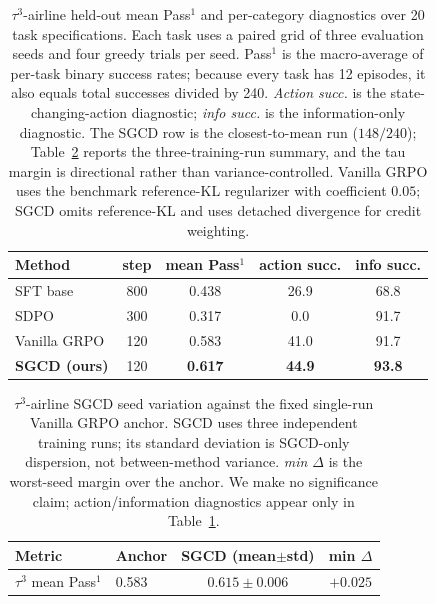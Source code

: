 \begin{table}[t]
  \centering
  \venuecompacttablefont
  \setlength{\tabcolsep}{2.2pt}
  \begin{tabular}{lcccc}
    \hline
    \textbf{Method} & \textbf{step} & \textbf{mean Pass$^1$} & \textbf{action succ.} & \textbf{info succ.} \\
    \hline
    SFT base              & 800 & 0.438 & 26.9 & 68.8 \\
    SDPO                  & 300 & 0.317 & 0.0 & 91.7 \\
    Vanilla GRPO         & 120 & 0.583 & 41.0 & 91.7 \\
    \textbf{SGCD (ours)}  & 120 & \textbf{0.617} & \textbf{44.9} & \textbf{93.8} \\
    \hline
  \end{tabular}
  \caption{$\tau^3$-airline held-out mean Pass$^1$ and per-category
    diagnostics over 20 task specifications. Each task uses a paired grid of
    three evaluation seeds and four greedy trials per seed. Pass$^1$ is the
    macro-average of per-task binary success rates; because every task has 12
    episodes, it also equals total successes divided by 240. \emph{Action succ.} is the state-changing-action
    diagnostic; \emph{info succ.} is the information-only diagnostic. The SGCD
    row is the closest-to-mean run ($148/240$); Table~\ref{tab:seedrobust}
    reports the three-training-run summary, and the tau margin is directional rather
    than variance-controlled. Vanilla GRPO uses the benchmark reference-KL
    regularizer with coefficient $0.05$; SGCD omits reference-KL and uses
    detached divergence for credit weighting.}
  \label{tab:tau3}
\end{table}

\begin{table}[t]
\centering
\small
\setlength{\tabcolsep}{4pt}
  \begin{tabular}{llcc}
\toprule
  Metric & Anchor & SGCD (mean$\pm$std) & min $\Delta$ \\
\midrule
$\tau^3$ mean Pass$^1$  & 0.583 & $0.615\pm0.006$ & $+0.025$ \\
  \bottomrule
\end{tabular}
\caption{$\tau^3$-airline SGCD seed variation against the fixed single-run
Vanilla GRPO anchor. SGCD uses three independent training runs; its standard
deviation is SGCD-only dispersion, not between-method variance. \emph{min
$\Delta$} is the worst-seed margin over the anchor. We make no significance
claim; action/information diagnostics appear only in Table~\ref{tab:tau3}.}
\label{tab:seedrobust}
\end{table}
